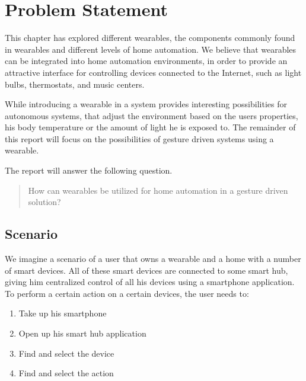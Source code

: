 \section{Problem Statement}\label{sec:researchstatement}

This chapter has explored different wearables, 
the components commonly found in wearables and different levels of home automation. 
We believe that wearables can be integrated into home automation environments, 
in order to provide an attractive interface for controlling devices connected to the Internet, 
such as light bulbs, thermostats, and music centers.

While introducing a wearable in a system provides interesting possibilities for autonomous systems, 
that adjust the environment based on the users properties, 
\eg his body temperature or the amount of light he is exposed to. 
The remainder of this report will focus on the possibilities of gesture driven systems using a wearable.

The report will answer the following question.

\begin{framed}
    \begin{quote}
      How can wearables be utilized for home automation in a gesture driven solution?
    \end{quote}
\end{framed}

\subsection{Scenario}
We imagine a scenario of a user that owns a wearable and a home with a number of smart devices. 
All of these smart devices are connected to some smart hub, 
giving him centralized control of all his devices using \eg a smartphone application.
To perform a certain action on a certain devices, the user needs to:
\begin{enumerate}
  \item Take up his smartphone
  \item Open up his smart hub application
  \item Find and select the device
  \item Find and select the action
\end{enumerate}

